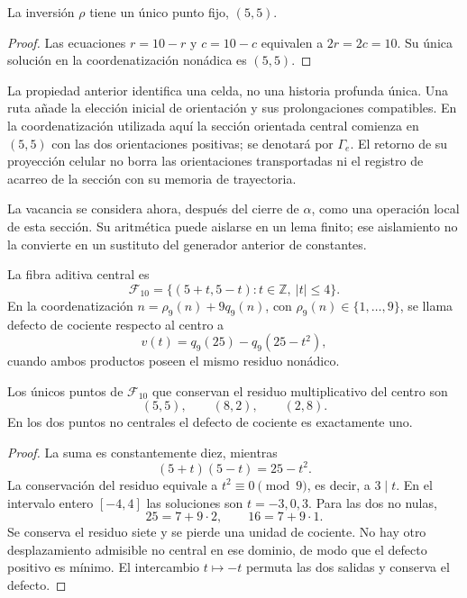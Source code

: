 \begin{proposition}
La inversión \(\rho\) tiene un único punto fijo, \((5,5)\).
\end{proposition}
\begin{proof}
Las ecuaciones \(r=10-r\) y \(c=10-c\) equivalen a
\(2r=2c=10\). Su única solución en la coordenatización nonádica es \((5,5)\).
\end{proof}

La propiedad anterior identifica una celda, no una historia profunda
única. Una ruta añade la elección inicial de orientación y sus
prolongaciones compatibles. En la coordenatización utilizada aquí la sección
orientada central comienza en \((5,5)\) con las dos orientaciones
positivas; se denotará por \(\Gamma_e\). El retorno de su proyección
celular no borra las orientaciones transportadas ni el registro de
acarreo de la sección con su memoria de trayectoria.

La vacancia se considera ahora, después del cierre de \(\alpha\), como
una operación local de esta sección. Su aritmética puede aislarse en un
lema finito; ese aislamiento no la convierte en un sustituto del
generador anterior de constantes.

\begin{definition}
La fibra aditiva central es
\[
 \mathcal F_{10}
 =\{(5+t,5-t):t\in\mathbb Z,\ |t|\leq4\}.
\]
En la coordenatización \(n=\rho_9(n)+9q_9(n)\), con
\(\rho_9(n)\in\{1,\ldots,9\}\), se llama defecto de cociente respecto
al centro a
\[
 v(t)=q_9(25)-q_9(25-t^2),
\]
cuando ambos productos poseen el mismo residuo nonádico.
\end{definition}

\begin{lemma}
Los únicos puntos de \(\mathcal F_{10}\) que conservan el residuo
multiplicativo del centro son
\[
 (5,5),\qquad (8,2),\qquad (2,8).
\]
En los dos puntos no centrales el defecto de cociente es exactamente uno.
\end{lemma}
\begin{proof}
La suma es constantemente diez, mientras
\[
 (5+t)(5-t)=25-t^2.
\]
La conservación del residuo equivale a \(t^2\equiv0\pmod9\), es decir,
a \(3\mid t\). En el intervalo entero \([-4,4]\) las soluciones son
\(t=-3,0,3\). Para las dos no nulas,
\[
 25=7+9\cdot2,\qquad16=7+9\cdot1.
\]
Se conserva el residuo siete y se pierde una unidad de cociente. No hay
otro desplazamiento admisible no central en ese dominio, de modo que el
defecto positivo es mínimo. El intercambio \(t\mapsto-t\) permuta las
dos salidas y conserva el defecto.
\end{proof}

